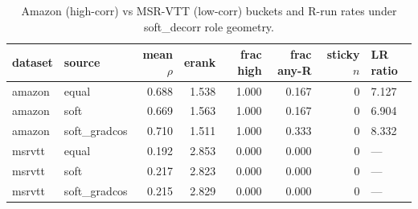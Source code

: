 \begin{table}[t]\centering
\caption{Amazon (high-corr) vs MSR-VTT (low-corr) buckets and R-run rates under soft\_decorr role geometry.}
\label{tab:agod-decorr-buckets}
\begin{tabular}{llrrrrr}\toprule
dataset & source & mean $\rho$ & erank & frac high & frac any-R & sticky $n$ & LR ratio \\
\midrule
amazon & equal & 0.688 & 1.538 & 1.000 & 0.167 & 0 & 7.127 \\
amazon & soft & 0.669 & 1.563 & 1.000 & 0.167 & 0 & 6.904 \\
amazon & soft\_gradcos & 0.710 & 1.511 & 1.000 & 0.333 & 0 & 8.332 \\
msrvtt & equal & 0.192 & 2.853 & 0.000 & 0.000 & 0 & — \\
msrvtt & soft & 0.217 & 2.823 & 0.000 & 0.000 & 0 & — \\
msrvtt & soft\_gradcos & 0.215 & 2.829 & 0.000 & 0.000 & 0 & — \\
\bottomrule
\end{tabular}
\end{table}
